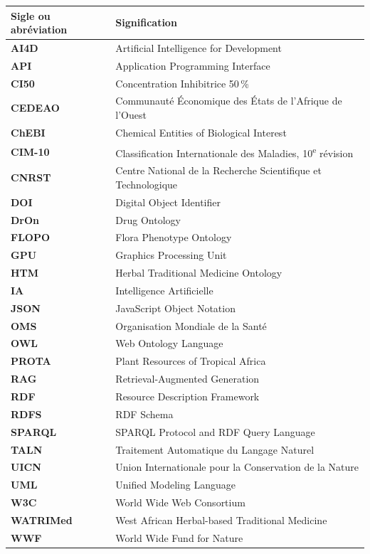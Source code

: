 \begingroup
\footnotesize
\renewcommand{\arraystretch}{1.05}
\begin{tabular}{>{\bfseries}p{3.6cm} p{11.4cm}}
\toprule
Sigle ou abréviation & Signification \\
\midrule
AI4D & Artificial Intelligence for Development \\
API & Application Programming Interface \\
CI50 & Concentration Inhibitrice 50\,\% \\
CEDEAO & Communauté Économique des États de l'Afrique de l'Ouest \\
ChEBI & Chemical Entities of Biological Interest \\
CIM-10 & Classification Internationale des Maladies, 10\textsuperscript{e} révision \\
CNRST & Centre National de la Recherche Scientifique et Technologique \\
DOI & Digital Object Identifier \\
DrOn & Drug Ontology \\
FLOPO & Flora Phenotype Ontology \\
GPU & Graphics Processing Unit \\
HTM & Herbal Traditional Medicine Ontology \\
IA & Intelligence Artificielle \\
JSON & JavaScript Object Notation \\
OMS & Organisation Mondiale de la Santé \\
OWL & Web Ontology Language \\
PROTA & Plant Resources of Tropical Africa \\
RAG &Retrieval-Augmented Generation \\
RDF & Resource Description Framework \\
RDFS & RDF Schema \\
SPARQL & SPARQL Protocol and RDF Query Language \\
TALN & Traitement Automatique du Langage Naturel \\
UICN & Union Internationale pour la Conservation de la Nature \\
UML & Unified Modeling Language \\
W3C & World Wide Web Consortium \\
WATRIMed & West African Herbal-based Traditional Medicine \\
WWF & World Wide Fund for Nature \\
\bottomrule
\end{tabular}
\endgroup